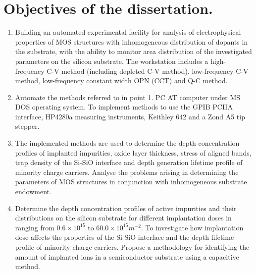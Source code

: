 
\chapter{Objectives of the dissertation.}\label{Chapter2}

\begin{enumerate}
\item Building an automated experimental facility for analysis of
  electrophysical properties of MOS structures with inhomogeneous
  distribution of dopants in the substrate, with the ability to
  monitor area distribution of the investigated parameters on the
  silicon substrate.  The workstation includes a high-frequency C-V
  method (including depleted C-V method), low-frequency C-V method,
  low-frequency constant width OPN (CCT) and Q-C method.
\item Automate the methods referred to in point 1.  PC AT computer
  under MS DOS operating system.  To implement methods to use the GPIB
  PCIIA interface, HP4280a measuring instruments, Keithley 642 and a
  Zond A5 tip stepper.
\item The implemented methods are used to determine the depth
  concentration profiles of implanted impurities, oxide layer
  thickness, stress of aligned bands, trap density of the Si-SiO
  interface and depth generation lifetime profile of minority charge
  carriers.  Analyse the problems arising in determining the
  parameters of MOS structures in conjunction with inhomogeneous
  substrate endowment.
\item Determine the depth concentration profiles of active impurities
  and their distributions on the silicon substrate for different
  implantation doses in ranging from $0.6\times{10}^{15}$ to
  $60.0\times{10}^{15}{m}^{-2}$. To investigate how implantation dose
  affects the properties of the Si-SiO interface and the depth
  lifetime profile of minority charge carriers.  Propose a methodology
  for identifying the amount of implanted ions in a semiconductor
  substrate using a capacitive method.
\end{enumerate}
